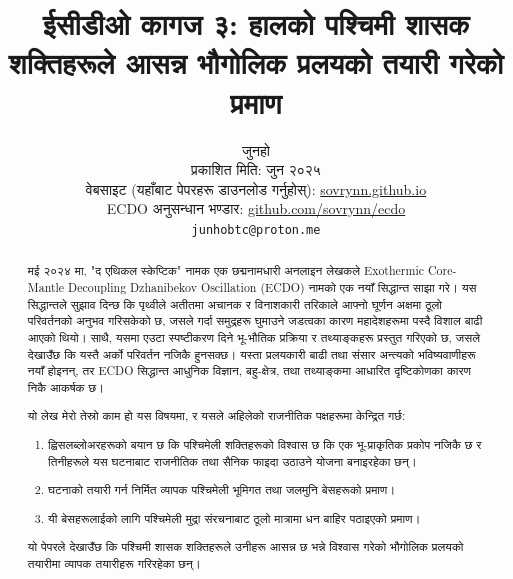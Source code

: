 \documentclass[10pt,twocolumn,letterpaper]{article}
\begin{document}
\title{ईसीडीओ कागज ३: हालको पश्चिमी शासक शक्तिहरूले आसन्न भौगोलिक प्रलयको तयारी गरेको प्रमाण}

\author{जुनहो\\
प्रकाशित मिति: जुन २०२५\\
वेबसाइट (यहाँबाट पेपरहरू डाउनलोड गर्नुहोस्): \href{https://sovrynn.github.io}{sovrynn.github.io}\\
ECDO अनुसन्धान भण्डार: \href{https://github.com/sovrynn/ecdo}{github.com/sovrynn/ecdo}\\
{\tt\small junhobtc@proton.me}
}

\maketitle

\begin{abstract}
मई २०२४ मा, "द एथिकल स्केप्टिक" नामक एक छद्मनामधारी अनलाइन लेखकले \cite{0} Exothermic Core-Mantle Decoupling Dzhanibekov Oscillation (ECDO) \cite{1} नामको एक नयाँ सिद्धान्त साझा गरे। यस सिद्धान्तले सुझाव दिन्छ कि पृथ्वीले अतीतमा अचानक र विनाशकारी तरिकाले आफ्नो घूर्णन अक्षमा ठूलो परिवर्तनको अनुभव गरिसकेको छ, जसले गर्दा समुद्रहरू घुमाउने जडत्वका कारण महादेशहरूमा पस्दै विशाल बाढी आएको थियो। साथै, यसमा एउटा स्पष्टीकरण दिने भू-भौतिक प्रक्रिया र तथ्याङ्कहरू प्रस्तुत गरिएको छ, जसले देखाउँछ कि यस्तै अर्को परिवर्तन नजिकै हुनसक्छ। यस्ता प्रलयकारी बाढी तथा संसार अन्त्यको भविष्यवाणीहरू नयाँ होइनन्, तर ECDO सिद्धान्त आधुनिक विज्ञान, बहु-क्षेत्र, तथा तथ्याङ्कमा आधारित दृष्टिकोणका कारण निकै आकर्षक छ।

यो लेख मेरो तेस्रो काम हो \cite{2,3} यस विषयमा, र यसले अहिलेको राजनीतिक पक्षहरूमा केन्द्रित गर्छ:
\begin{flushleft}
\begin{enumerate}
    \item ह्विसलब्लोअरहरूको बयान छ कि पश्चिमेली शक्तिहरूको विश्वास छ कि एक भू-प्राकृतिक प्रकोप नजिकै छ र तिनीहरूले यस घटनाबाट राजनीतिक तथा सैनिक फाइदा उठाउने योजना बनाइरहेका छन्।
    \item घटनाको तयारी गर्न निर्मित व्यापक पश्चिमेली भूमिगत तथा जलमुनि बेसहरूको प्रमाण।
    \item यी बेसहरूलाईको लागि पश्चिमेली मुद्रा संरचनाबाट ठूलो मात्रामा धन बाहिर पठाइएको प्रमाण।
\end{enumerate}
\end{flushleft}
यो पेपरले देखाउँछ कि पश्चिमी शासक शक्तिहरूले उनीहरू आसन्न छ भन्ने विश्वास गरेको भौगोलिक प्रलयको तयारीमा व्यापक तयारीहरू गरिरहेका छन्।
\end{abstract}
\end{document}
